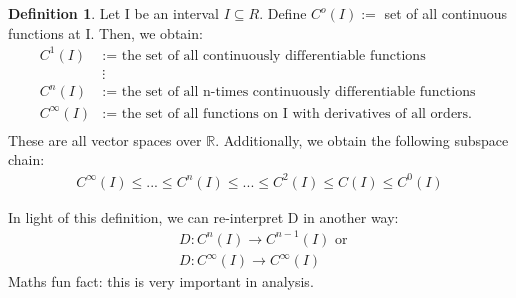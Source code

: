 \documentclass[a4paper, 12pt]{article}
\theoremstyle{definition}
\theoremstyle{definition}
\newtheorem{defn}{Definition}[section]
\theoremstyle{definition}
\theoremstyle{definition}
\begin{document}
{\begin{defn}
	Let I be an interval $I \subseteq R$. Define $C^o(I):=$ set of all continuous functions at I. Then, we obtain:
	\begin{align*}
		C^1 (I) & := \mbox{ the set of all continuously differentiable functions } \\ 
		& \vdots  \\
		C^n (I) & := \mbox{ the set of all n-times continuously differentiable functions } \\ 
		C^\infty (I) &  := \mbox{ the set of all functions on I with derivatives of all orders. } \\
	\end{align*}
	These are all vector spaces over $\mathbb{R}$. Additionally, we obtain the following subspace chain: 
	\begin{align*}
		C^{\infty} (I) \leq ... \leq C^n(I) \leq ... \leq C^2 (I) \leq C (I) \leq C^0 (I) 
	\end{align*}
\end{defn}

In light of this definition, we can re-interpret D in another way: 
\begin{align*}
	& D: C^n (I) \rightarrow C^{n-1} (I)  \mbox { or } \\
	& D: C^\infty (I) \rightarrow C^\infty (I) 
\end{align*}
Maths fun fact: this is very important in analysis. 

}
\end{document}
